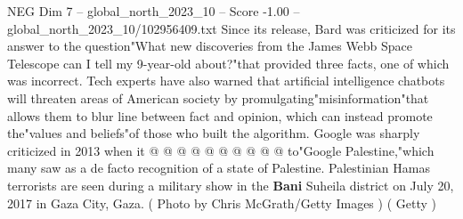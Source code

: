 \begin{textsample}{NEG Dim 7 – global\_north\_2023\_10 – Score -1.00 – global\_north\_2023\_10/102956409.txt}
Since its release, Bard was criticized for its answer to the question"What new discoveries from the James Webb Space Telescope can I tell my 9-year-old about?"that provided three facts, one of which was incorrect.
Tech experts have also warned that artificial intelligence chatbots will threaten areas of American society by promulgating"misinformation"that allows them to blur line between fact and opinion, which can instead promote the"values and beliefs"of those who built the algorithm.
Google was sharply criticized in 2013 when it @ @ @ @ @ @ @ @ @ @ to"Google Palestine,"which many saw as a de facto recognition of a state of Palestine.
Palestinian Hamas terrorists are seen during a military show in the \textbf{Bani} Suheila district on July 20, 2017 in Gaza City, Gaza. ( Photo by Chris McGrath/Getty Images ) ( Getty )

\end{textsample}
